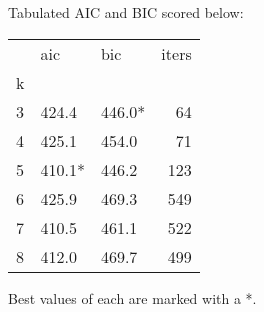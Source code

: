 
Tabulated AIC and BIC scored below:
\vspace{4mm}

\begin{tabular}{lllr}
\toprule
{} &     aic &     bic &  iters \\
k &         &         &        \\
\midrule
3 &   424.4 &  446.0* &     64 \\
4 &   425.1 &   454.0 &     71 \\
5 &  410.1* &   446.2 &    123 \\
6 &   425.9 &   469.3 &    549 \\
7 &   410.5 &   461.1 &    522 \\
8 &   412.0 &   469.7 &    499 \\
\bottomrule
\end{tabular}

\vspace{4mm}
\noindent Best values of each are marked with a *.
